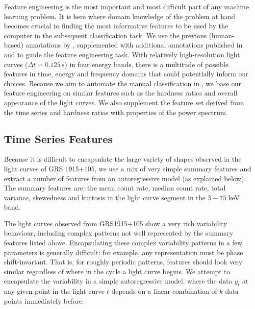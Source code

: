 \documentclass[fleqn,usenatbib]{mnras}
\begin{document}
Feature engineering is the most important and most difficult part of any machine learning problem. It is here where domain knowledge of the problem at hand becomes crucial to finding the most informative features to be used by the computer in the subsequent classification task. 
We use the previous (human-based) annotations by \citet{belloni2000}, supplemented with additional annotations published in \citet{kleinwolt2002} and \citet{hannikainen2003} to guide the feature engineering task. With relatively high-resolution light curves ($\Delta t = 0.125 \,\mathrm{s}$) in four energy bands, there is a multitude of possible features in time, energy and frequency domains that could potentially inform our choices. Because we aim to automate the manual classification in \citet{belloni2000}, we base our feature engineering on similar features such as the hardness ratios and overall appearance of the light curves. We also supplement the feature set derived from the time series and hardness ratios with properties of the power spectrum.

\subsection{Time Series Features}

Because it is difficult to encapsulate the large variety of shapes observed in the light curves of GRS 1915+105, we use a mix of very simple summary features and extract a number of features from an autoregressive model (as explained below). The summary features are: the mean count rate, median count rate, total variance, skewedness and kurtosis in the light curve segment in the $3 - 75$ keV band. 

The light curves observed from GRS1915+105 show a very rich variability behaviour, including complex patterns not well represented by the summary features listed above. Encapsulating these complex variability patterns in a few parameters is generally difficult: for example, any representation must be phase shift-invariant. That is, for roughly periodic patterns, features should look very similar regardless of where in the cycle a light curve begins. We attempt to encapsulate the variability in a simple autoregressive model, where the data $y_t$ at any given point in the light curve $t$ depends on a linear combination of $k$ data points immediately before:
\end{document}
